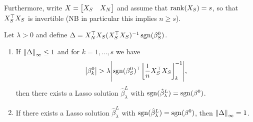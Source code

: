 Furthermore, write $X = \mqty[ X_S & X_N]$ and assume that $\rank(X_S) = s$, so that $X_S^\top X_S$ is invertible (NB in particular this implies $n \geq s$). 
\begin{theorem}
Let $\lambda > 0$ and define $\Delta = X_N^\top X_S(X_S^\top X_S)^{-1} \operatorname{sgn}(\beta^0_S)$. 
\begin{enumerate}
	\item If $\norm{\Delta}_{\infty} \leq 1$ and for $k = 1, \dotsc, s$ we have
	\[
	\abs{\beta^0_k} > \lambda \abs{\operatorname{sgn}(\beta^0_S)^\top \qty[\frac1n X_S^\top X_S]^{-1}_k},
	\]
	then there exists a Lasso solution $\hat\beta_\lambda^L$ with $\operatorname{sgn}(\hat\beta_\lambda^L) = \operatorname{sgn}(\beta^0)$. 
	
	\item If there exists a Lasso solution $\hat\beta_\lambda^L$ with $\operatorname{sgn}(\hat\beta_\lambda^L) = \operatorname{sgn}(\beta^0)$, then $\norm{\Delta}_{\infty} = 1$. 
\end{enumerate}
\end{theorem}

